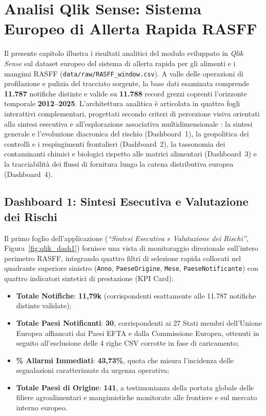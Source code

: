 \chapter{Analisi Qlik Sense: Sistema Europeo di Allerta Rapida RASFF}
\label{chap:qlik}

Il presente capitolo illustra i risultati analitici del modulo sviluppato in \textit{Qlik Sense} sul dataset europeo del sistema di allerta rapida per gli alimenti e i mangimi RASFF (\texttt{data/raw/RASFF\_window.csv}). A valle delle operazioni di profilazione e pulizia del tracciato sorgente, la base dati esaminata comprende \textbf{11.787} notifiche distinte e valide su \textbf{11.788} record grezzi coprenti l'orizzonte temporale \textbf{2012--2025}. L'architettura analitica è articolata in quattro fogli interattivi complementari, progettati secondo criteri di percezione visiva orientati alla sintesi esecutiva e all'esplorazione associativa multidimensionale \citep{few2013,sharda2020}: la sintesi generale e l'evoluzione diacronica del rischio (Dashboard~1), la geopolitica dei controlli e i respingimenti frontalieri (Dashboard~2), la tassonomia dei contaminanti chimici e biologici rispetto alle matrici alimentari (Dashboard~3) e la tracciabilità dei flussi di fornitura lungo la catena distributiva europea (Dashboard~4).

\section{Dashboard 1: Sintesi Esecutiva e Valutazione dei Rischi}
\label{sec:qlik_dash1}

Il primo foglio dell'applicazione (\textit{``Sintesi Esecutiva e Valutazione dei Rischi''}, Figura~\ref{fig:qlik_dash1}) fornisce una vista di monitoraggio direzionale sull'intero perimetro RASFF, integrando quattro filtri di selezione rapida collocati nel quadrante superiore sinistro (\texttt{Anno}, \texttt{PaeseOrigine}, \texttt{Mese}, \texttt{PaeseNotificante}) con quattro indicatori sintetici di prestazione (KPI Card):
\begin{itemize}
    \item \textbf{Totale Notifiche}: \textbf{11,79k} (corrispondenti esattamente alle 11.787 notifiche distinte validate);
    \item \textbf{Totale Paesi Notificanti}: \textbf{30}, corrispondenti ai 27 Stati membri dell'Unione Europea affiancati dai Paesi EFTA e dalla Commissione Europea, ottenuti in seguito all'esclusione delle 4 righe CSV corrotte in fase di caricamento;
    \item \textbf{\% Allarmi Immediati}: \textbf{43,73\%}, quota che misura l'incidenza delle segnalazioni caratterizzate da urgenza operativa;
    \item \textbf{Totale Paesi di Origine}: \textbf{141}, a testimonianza della portata globale delle filiere agroalimentari e mangimistiche monitorate alle frontiere e sul mercato interno europeo.
\end{itemize}

